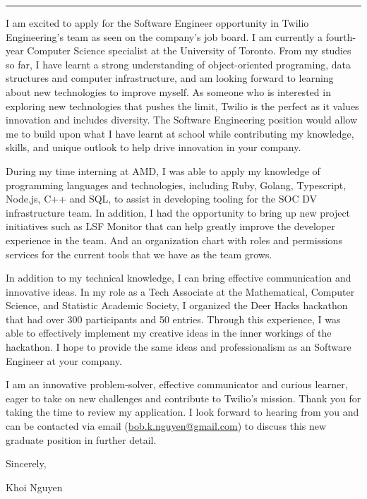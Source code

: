 \documentclass[
	12pt, %
]{resume} %
\begin{document}
    \medskip
    \hrule %
    \medskip
    
    I am excited to apply for the Software Engineer opportunity in Twilio Engineering's team as seen on the company's job board. I am currently a fourth-year Computer Science specialist at the University of Toronto. From my studies so far, I have learnt a strong understanding of object-oriented programing, data structures and computer infrastructure, and am looking forward to learning about new technologies to improve myself. As someone who is interested in exploring new technologies that pushes the limit, Twilio is the perfect as it values innovation and includes diversity. The Software Engineering position would allow me to build upon what I have learnt at school while contributing my knowledge, skills, and unique outlook to help drive innovation in your company.

    During my time interning at AMD, I was able to apply my knowledge of programming languages and technologies, including Ruby, Golang, Typescript, Node.js, C++ and SQL, to assist in developing tooling for the SOC DV infrastructure team. In addition, I had the opportunity to bring up new project initiatives such as LSF Monitor that can help greatly improve the developer experience in the team. And an organization chart with roles and permissions services for the current tools that we have as the team grows.


    In addition to my technical knowledge, I can bring effective communication and innovative ideas. In my role as a Tech Associate at the Mathematical, Computer Science, and Statistic Academic Society,  I organized the Deer Hacks hackathon that had over 300 participants and 50 entries. Through this experience, I was able to effectively implement my creative ideas in the inner workings of the hackathon. I hope to provide the same ideas and professionalism as an Software Engineer at your company.

    I am an innovative problem-solver, effective communicator and curious learner, eager to take on new challenges and contribute to Twilio's mission. Thank you for taking the time to review my application. I look forward to hearing from you and can be contacted via email (\href{mailto:bob.k.nguyen@gmail.com}{bob.k.nguyen@gmail.com}) to discuss this new graduate position in further detail.

    Sincerely,

    Khoi Nguyen
\end{document}
